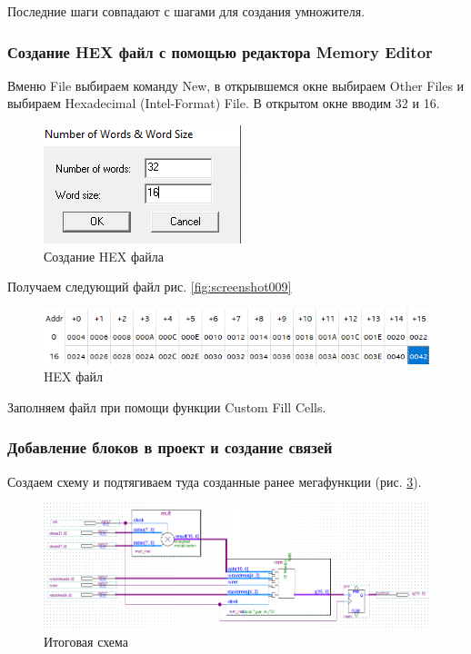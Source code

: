 \documentclass[a4paper,14pt]{article}
\begin{document}
Последние шаги совпадают с шагами для создания умножителя.

\subsubsection{Создание HEX файл с помощью редактора Memory Editor}

Вменю File выбираем команду New, в открывшемся окне выбираем Other Files и выбираем Hexadecimal (Intel-Format) File. В открытом окне вводим 32 и 16.

\begin{figure}[H]
	\centering
	\includegraphics[width=0.4\linewidth]{image/lab5/screenshot008}
	\caption{Создание HEX файла}
	\label{fig:screenshot008}
\end{figure}

Получаем следующий файл рис. \ref{fig:screenshot009}

\begin{figure}[H]
	\centering
	\includegraphics[width=0.7\linewidth]{image/lab5/screenshot012}
	\caption{HEX файл}
	\label{fig:screenshot012}
\end{figure}


Заполняем файл при помощи функции Custom Fill Cells.

\subsubsection{Добавление блоков в проект и создание связей}

Создаем схему и подтягиваем туда созданные ранее мегафункции (рис. \ref{fig:screenshot011}).

\begin{figure}[H]
	\centering
	\includegraphics[width=0.8\linewidth]{image/lab5/screenshot011}
	\caption{Итоговая схема}
	\label{fig:screenshot011}
\end{figure}
\end{document}
